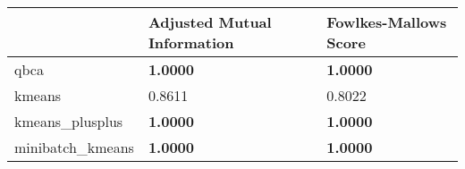 \begin{table}[htbp]
\centering
\begin{tabular}{lll}
\toprule
 & Adjusted Mutual Information & Fowlkes-Mallows Score \\
\midrule
qbca & \textbf{1.0000} & \textbf{1.0000} \\
kmeans & 0.8611 & 0.8022 \\
kmeans_plusplus & \textbf{1.0000} & \textbf{1.0000} \\
minibatch_kmeans & \textbf{1.0000} & \textbf{1.0000} \\
\bottomrule
\end{tabular}
\end{table}
